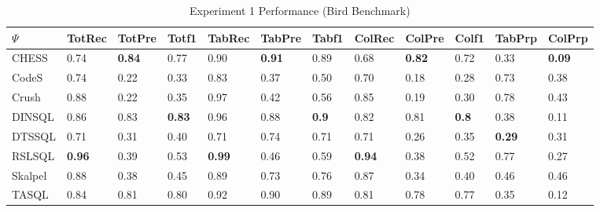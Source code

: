 \begin{table*}
\caption{Experiment 1 Performance (Bird Benchmark)}
\label{tab:exp1-bird}
\begin{tabular}{llllllllllll}
\toprule
$\Psi$ & TotRec & TotPre & Totf1 & TabRec & TabPre & Tabf1 & ColRec & ColPre & Colf1 & TabPrp & ColPrp \\
\midrule
CHESS & 0.74 & \textbf{0.84} & 0.77 & 0.90 & \textbf{0.91} & 0.89 & 0.68 & \textbf{0.82} & 0.72 & 0.33 & \textbf{0.09} \\
CodeS & 0.74 & 0.22 & 0.33 & 0.83 & 0.37 & 0.50 & 0.70 & 0.18 & 0.28 & 0.73 & 0.38 \\
Crush & 0.88 & 0.22 & 0.35 & 0.97 & 0.42 & 0.56 & 0.85 & 0.19 & 0.30 & 0.78 & 0.43 \\
DINSQL & 0.86 & 0.83 & \textbf{0.83} & 0.96 & 0.88 & \textbf{0.9} & 0.82 & 0.81 & \textbf{0.8} & 0.38 & 0.11 \\
DTSSQL & 0.71 & 0.31 & 0.40 & 0.71 & 0.74 & 0.71 & 0.71 & 0.26 & 0.35 & \textbf{0.29} & 0.31 \\
RSLSQL & \textbf{0.96} & 0.39 & 0.53 & \textbf{0.99} & 0.46 & 0.59 & \textbf{0.94} & 0.38 & 0.52 & 0.77 & 0.27 \\
Skalpel & 0.88 & 0.38 & 0.45 & 0.89 & 0.73 & 0.76 & 0.87 & 0.34 & 0.40 & 0.46 & 0.46 \\
TASQL & 0.84 & 0.81 & 0.80 & 0.92 & 0.90 & 0.89 & 0.81 & 0.78 & 0.77 & 0.35 & 0.12 \\
\bottomrule
\end{tabular}
\end{table*}
